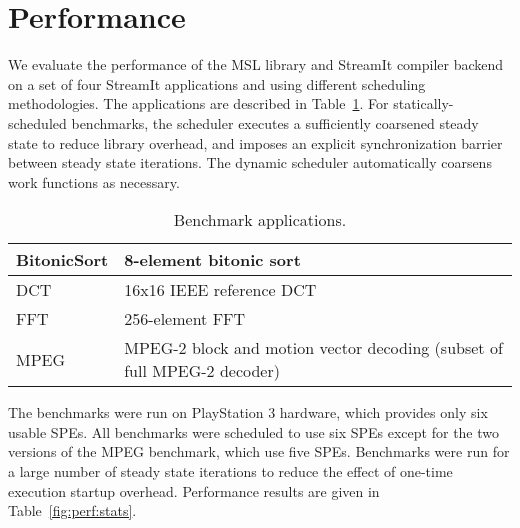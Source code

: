 \section{Performance}\label{ch:perf}

We evaluate the performance of the MSL library and StreamIt compiler backend
on a set of four StreamIt applications and using different scheduling
methodologies. The applications are described in Table~\ref{fig:perf:apps}.
For statically-scheduled benchmarks, the scheduler executes a sufficiently
coarsened steady state to reduce library overhead, and imposes an explicit
synchronization barrier between steady state iterations. The dynamic scheduler
automatically coarsens work functions as necessary.

\begin{table}[!htb]
\begin{center}
\begin{tabular}{|l|p{2.25in}|}
\hline
BitonicSort & 8-element bitonic sort \\
\hline
DCT         & 16x16 IEEE reference DCT \\
\hline
FFT         & 256-element FFT \\
\hline
MPEG        & MPEG-2 block and motion vector decoding (subset of full MPEG-2 decoder) \\
\hline
\end{tabular}
\end{center}
\caption{Benchmark applications.}
\label{fig:perf:apps}
\end{table}

The benchmarks were run on PlayStation 3 hardware, which provides only
six usable SPEs. All benchmarks were scheduled to use six SPEs except
for the two versions of the MPEG benchmark, which use five SPEs.
Benchmarks were run for a large number of steady state iterations
to reduce the effect of one-time execution startup overhead.
Performance results are given in Table~\ref{fig:perf:stats}.

